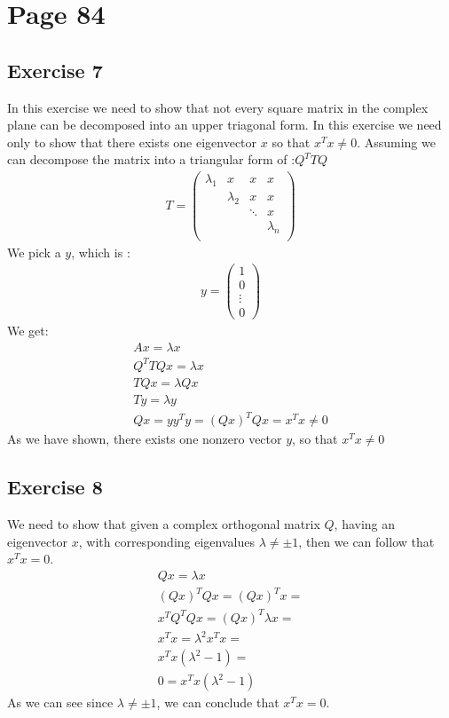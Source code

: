\section{Page 84}
\subsection{Exercise 7}
In this exercise we need to show that not every square matrix in the complex plane can be decomposed into an upper triagonal form.
In this exercise we need only to show that there exists one eigenvector $x$ so that $x^Tx \neq 0$.
Assuming we can decompose the matrix into a triangular form of :$ Q^T T Q$
\begin{gather*}
T = \left( \begin{array}{cccc}
\lambda_1 & x & x & x\\
& \lambda_2 & x & x\\
& & \ddots & x\\
& & & \lambda_n\\
\end{array} \right)
\end{gather*}
We pick a $y$, which is :
\begin{gather*}
y = \left( \begin{array}{c}
1 \\ 
0 \\
\vdots \\
0
\end{array} \right)
\end{gather*}
We get:
\begin{gather*}
Ax = \lambda x\\
Q^T T Q x = \lambda x\\
T Q x = \lambda Q x\\
T y = \lambda y\\
Qx = y
y^T y = (Qx)^T Qx = x^T x \neq 0
\end{gather*}
As we have shown, there exists one nonzero vector $y$, so that $x^T x \neq 0$
\subsection{Exercise 8}
We need to show that given a complex orthogonal matrix $Q$, having an eigenvector $x$, with corresponding eigenvalues $\lambda \neq \pm 1$, then we can follow that $x^Tx = 0$.
\begin{gather*}
Qx = \lambda x \\
\left( Q x \right)^T Qx = \left( Qx \right)^T x =\\
x^TQ^T Q x = \left( Q x \right)^T \lambda x =\\
x^T x = \lambda ^2 x^T x = \\
x^T x \left( \lambda^2 -1 \right) =\\
0 = x^T x \left( \lambda^2 -1 \right)
\end{gather*}
As we can see since $\lambda \neq \pm 1$, we can conclude that $x^T x=0$.

